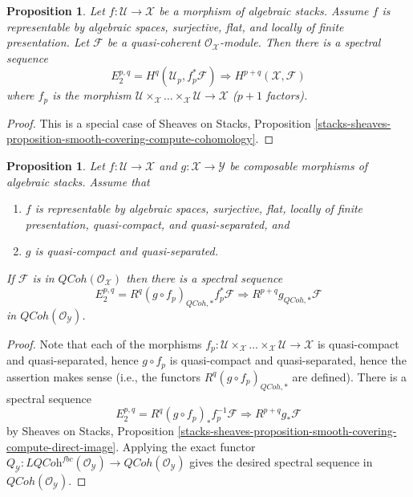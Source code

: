 \documentclass{stacks-project}
\theoremstyle{plain}
\newtheorem{proposition}[subsection]{Proposition}
\theoremstyle{definition}
\theoremstyle{remark}
\numberwithin{equation}{subsection}
\def\QCoh{\mathit{QCoh}}
\begin{document}
\begin{proposition}
\label{proposition-smooth-covering-compute-cohomology}
Let $f : \mathcal{U} \to \mathcal{X}$ be a morphism of algebraic stacks.
Assume $f$ is representable by algebraic spaces, surjective, flat, and
locally of finite presentation. Let $\mathcal{F}$ be a quasi-coherent
$\mathcal{O}_\mathcal{X}$-module. Then there is a spectral sequence
$$
E_2^{p, q} = H^q(\mathcal{U}_p, f_p^*\mathcal{F})
\Rightarrow
H^{p + q}(\mathcal{X}, \mathcal{F})
$$
where $f_p$ is the morphism
$\mathcal{U} \times_\mathcal{X} \ldots \times_\mathcal{X} \mathcal{U} \to
\mathcal{X}$ ($p + 1$ factors).
\end{proposition}

\begin{proof}
This is a special case of
Sheaves on Stacks, Proposition
\ref{stacks-sheaves-proposition-smooth-covering-compute-cohomology}.
\end{proof}

\begin{proposition}
\label{proposition-smooth-covering-compute-direct-image}
Let $f : \mathcal{U} \to \mathcal{X}$ and $g : \mathcal{X} \to \mathcal{Y}$
be composable morphisms of algebraic stacks.
Assume that
\begin{enumerate}
\item $f$ is representable by algebraic spaces, surjective,
flat, locally of finite presentation, quasi-compact, and quasi-separated, and
\item $g$ is quasi-compact and quasi-separated.
\end{enumerate}
If $\mathcal{F}$ is in $\QCoh(\mathcal{O}_\mathcal{X})$ then
there is a spectral sequence
$$
E_2^{p, q} = R^q(g \circ f_p)_{\QCoh, *}f_p^*\mathcal{F}
\Rightarrow
R^{p + q}g_{\QCoh, *}\mathcal{F}
$$
in $\QCoh(\mathcal{O}_\mathcal{Y})$.
\end{proposition}

\begin{proof}
Note that each of the morphisms
$f_p : \mathcal{U} \times_\mathcal{X} \ldots \times_\mathcal{X} \mathcal{U} \to
\mathcal{X}$ is quasi-compact and quasi-separated, hence $g \circ f_p$
is quasi-compact and quasi-separated, hence the assertion makes sense
(i.e., the functors $R^q(g \circ f_p)_{\QCoh, *}$ are defined).
There is a spectral sequence
$$
E_2^{p, q} = R^q(g \circ f_p)_*f_p^{-1}\mathcal{F}
\Rightarrow
R^{p + q}g_*\mathcal{F}
$$
by Sheaves on Stacks, Proposition
\ref{stacks-sheaves-proposition-smooth-covering-compute-direct-image}.
Applying the exact functor
$Q_\mathcal{Y} : \textit{LQCoh}^{fbc}(\mathcal{O}_\mathcal{Y}) \to
\QCoh(\mathcal{O}_\mathcal{Y})$ gives the desired spectral sequence in
$\QCoh(\mathcal{O}_\mathcal{Y})$.
\end{proof}
\end{document}
